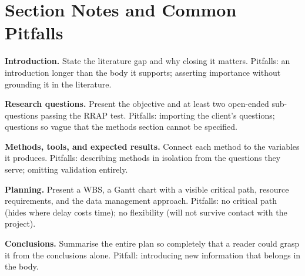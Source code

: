 \documentclass[../main.tex]{subfiles}
\begin{document}
\section{Section Notes and Common Pitfalls}
\label{sec:report-notes}

\textbf{Introduction.} State the literature gap and why closing it matters. Pitfalls: an introduction longer than the body it supports; asserting importance without grounding it in the literature.

\textbf{Research questions.} Present the objective and at least two open-ended sub-questions passing the RRAP test. Pitfalls: importing the client's questions; questions so vague that the methods section cannot be specified.

\textbf{Methods, tools, and expected results.} Connect each method to the variables it produces. Pitfalls: describing methods in isolation from the questions they serve; omitting validation entirely.

\textbf{Planning.} Present a WBS, a Gantt chart with a visible critical path, resource requirements, and the data management approach. Pitfalls: no critical path (hides where delay costs time); no flexibility (will not survive contact with the project).

\textbf{Conclusions.} Summarise the entire plan so completely that a reader could grasp it from the conclusions alone. Pitfall: introducing new information that belongs in the body.
\end{document}

